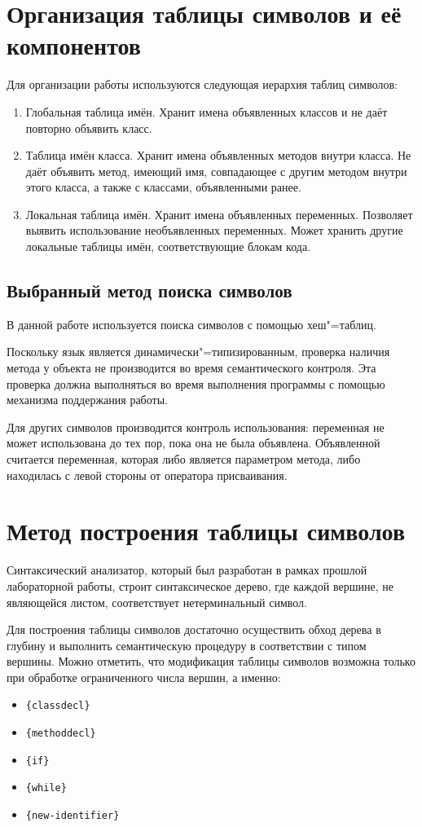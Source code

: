 \documentclass[a4paper,12pt,notitlepage,pdftex]{scrreprt}
\begin{document}
\chapter{Организация таблицы символов и её компонентов}
\label{chap:second}
    Для организации работы используются следующая иерархия таблиц символов:
    \begin{enumerate}
        \item Глобальная таблица имён.
            Хранит имена объявленных классов и не даёт повторно объявить класс.
        \item Таблица имён класса.
            Хранит имена объявленных методов внутри класса.
            Не даёт объявить метод, имеющий имя, совпадающее с другим методом внутри этого класса, а также с классами,
            объявленными ранее.
        \item Локальная таблица имён.
            Хранит имена объявленных переменных.
            Позволяет выявить использование необъявленных переменных.
            Может хранить другие локальные таблицы имён, соответствующие блокам кода.
    \end{enumerate}
    \section{Выбранный метод поиска символов}
    \label{sec:formal}
        В данной работе используется поиска символов с помощью хеш"=таблиц.

        Поскольку язык является динамически"=типизированным, проверка наличия метода у объекта не производится во
        время семантического контроля.
        Эта проверка должна выполняться во время выполнения программы с помощью механизма поддержания работы.

        Для других символов производится контроль использования: переменная не может использована до тех пор, пока она
        не была объявлена.
        Объявленной считается переменная, которая либо является параметром метода, либо находилась с левой стороны от
        оператора присваивания.

\chapter{Метод построения таблицы символов}
    Синтаксический анализатор, который был разработан в рамках прошлой лабораторной работы, строит синтаксическое
    дерево, где каждой вершине, не являющейся листом, соответствует нетерминальный символ.

    Для построения таблицы символов достаточно осуществить обход дерева в глубину и выполнить семантическую процедуру
    в соответствии с типом вершины.
    Можно отметить, что модификация таблицы символов возможна только при обработке ограниченного числа вершин, а
    именно:
    \begin{itemize}
        \item \verb'{classdecl}'
        \item \verb'{methoddecl}'
        \item \verb'{if}'
        \item \verb'{while}'
        \item \verb'{new-identifier}'
    \end{itemize}
\end{document}
